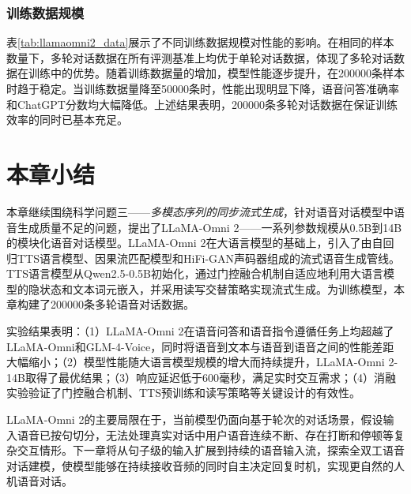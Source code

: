 \subsubsection{训练数据规模}



表\ref{tab:llamaomni2_data}展示了不同训练数据规模对性能的影响。在相同的样本数量下，多轮对话数据在所有评测基准上均优于单轮对话数据，体现了多轮对话数据在训练中的优势。随着训练数据量的增加，模型性能逐步提升，在200000条样本时趋于稳定。当训练数据量降至50000条时，性能出现明显下降，语音问答准确率和ChatGPT分数均大幅降低。上述结果表明，200000条多轮对话数据在保证训练效率的同时已基本充足。


\section{本章小结}

本章继续围绕科学问题三——\textit{多模态序列的同步流式生成}，针对语音对话模型中语音生成质量不足的问题，提出了LLaMA-Omni 2——一系列参数规模从0.5B到14B的模块化语音对话模型。LLaMA-Omni 2在大语言模型的基础上，引入了由自回归TTS语言模型、因果流匹配模型和HiFi-GAN声码器组成的流式语音生成管线。TTS语言模型从Qwen2.5-0.5B初始化，通过门控融合机制自适应地利用大语言模型的隐状态和文本词元嵌入，并采用读写交替策略实现流式生成。为训练模型，本章构建了200000条多轮语音对话数据。

实验结果表明：（1）LLaMA-Omni 2在语音问答和语音指令遵循任务上均超越了LLaMA-Omni和GLM-4-Voice，同时将语音到文本与语音到语音之间的性能差距大幅缩小；（2）模型性能随大语言模型规模的增大而持续提升，LLaMA-Omni 2-14B取得了最优结果；（3）响应延迟低于600毫秒，满足实时交互需求；（4）消融实验验证了门控融合机制、TTS预训练和读写策略等关键设计的有效性。

LLaMA-Omni 2的主要局限在于，当前模型仍面向基于轮次的对话场景，假设输入语音已按句切分，无法处理真实对话中用户语音连续不断、存在打断和停顿等复杂交互情形。下一章将从句子级的输入扩展到持续的语音输入流，探索全双工语音对话建模，使模型能够在持续接收音频的同时自主决定回复时机，实现更自然的人机语音对话。
